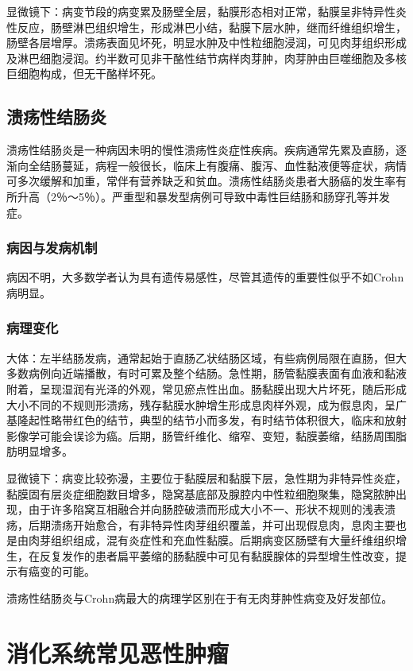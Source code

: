 显微镜下：病变节段的病变累及肠壁全层，黏膜形态相对正常，黏膜呈非特异性炎性反应，肠壁淋巴组织增生，形成淋巴小结，黏膜下层水肿，继而纤维组织增生，肠壁各层增厚。溃疡表面见坏死，明显水肿及中性粒细胞浸润，可见肉芽组织形成及淋巴细胞浸润。约半数可见非干酪性结节病样肉芽肿，肉芽肿由巨噬细胞及多核巨细胞构成，但无干酪样坏死。

\subsection{溃疡性结肠炎}

溃疡性结肠炎是一种病因未明的慢性溃疡性炎症性疾病。疾病通常先累及直肠，逐渐向全结肠蔓延，病程一般很长，临床上有腹痛、腹泻、血性黏液便等症状，病情可多次缓解和加重，常伴有营养缺乏和贫血。溃疡性结肠炎患者大肠癌的发生率有所升高（2％～5％）。严重型和暴发型病例可导致中毒性巨结肠和肠穿孔等并发症。

\subsubsection{病因与发病机制}

病因不明，大多数学者认为具有遗传易感性，尽管其遗传的重要性似乎不如Crohn病明显。

\subsubsection{病理变化}

大体：左半结肠发病，通常起始于直肠乙状结肠区域，有些病例局限在直肠，但大多数病例向近端播散，有时可累及整个结肠。急性期，肠管黏膜表面有血液和黏液附着，呈现湿润有光泽的外观，常见瘀点性出血。肠黏膜出现大片坏死，随后形成大小不同的不规则形溃疡，残存黏膜水肿增生形成息肉样外观，成为假息肉，呈广基隆起性略带红色的结节，典型的结节小而多发，有时结节体积很大，临床和放射影像学可能会误诊为癌。后期，肠管纤维化、缩窄、变短，黏膜萎缩，结肠周围脂肪明显增多。

显微镜下：病变比较弥漫，主要位于黏膜层和黏膜下层，急性期为非特异性炎症，黏膜固有层炎症细胞数目增多，隐窝基底部及腺腔内中性粒细胞聚集，隐窝脓肿出现，由于许多陷窝互相融合并向肠腔破溃而形成大小不一、形状不规则的浅表溃疡，后期溃疡开始愈合，有非特异性肉芽组织覆盖，并可出现假息肉，息肉主要也是由肉芽组织组成，混有炎症性和充血性黏膜。后期病变区肠壁有大量纤维组织增生，在反复发作的患者扁平萎缩的肠黏膜中可见有黏膜腺体的异型增生性改变，提示有癌变的可能。

溃疡性结肠炎与Crohn病最大的病理学区别在于有无肉芽肿性病变及好发部位。

\section{消化系统常见恶性肿瘤}

